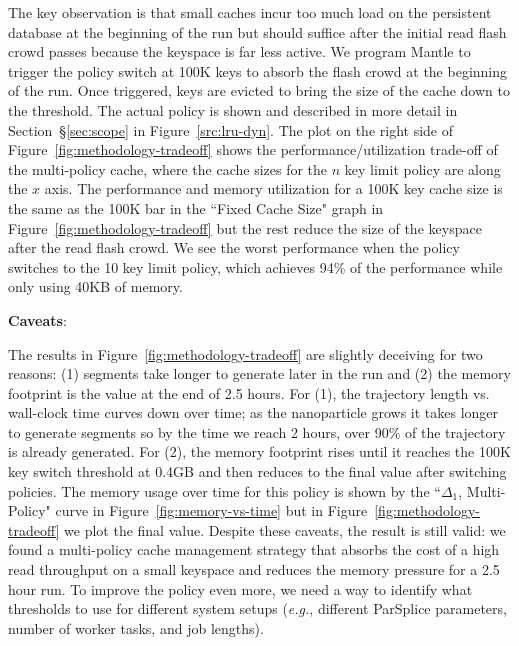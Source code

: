 The key observation is that small caches incur too much load on the persistent
database at the beginning of the run but should suffice after the initial read
flash crowd passes because the keyspace is far less active.  We program Mantle
to trigger the policy switch at 100K keys to absorb the flash crowd at the
beginning of the run. Once triggered, keys are evicted to bring the size of the
cache down to the threshold.  The actual policy is shown and described in more
detail in Section~\S\ref{sec:scope} in Figure~\ref{src:lru-dyn}.  The plot on
the right side of Figure~\ref{fig:methodology-tradeoff} shows the
performance/utilization trade-off of the multi-policy cache, where the cache
sizes for the \(n\) key limit policy are along the \(x\) axis.  The performance
and memory utilization for a 100K key cache size is the same as the 100K bar in
the ``Fixed Cache Size" graph in Figure~\ref{fig:methodology-tradeoff} but the
rest reduce the size of the keyspace after the read flash crowd.  We see the
worst performance when the policy switches to the 10 key limit policy, which
achieves 94\% of the performance while only using 40KB of memory. 

\textbf{Caveats}: 

The results in Figure~\ref{fig:methodology-tradeoff} are slightly deceiving for
two reasons: (1) segments take longer to generate later in the run and (2) the
memory footprint is the value at the end of 2.5 hours.  For (1), the trajectory
length vs.  wall-clock time curves down over time; as the nanoparticle grows it
takes longer to generate segments so by the time we reach 2 hours, over 90\% of
the trajectory is already generated.  For (2), the memory footprint rises until
it reaches the 100K key switch threshold at 0.4GB and then reduces to the final
value after switching policies. The memory usage over time for this policy is
shown by the ``\(\Delta_1\), Multi-Policy" curve in
Figure~\ref{fig:memory-vs-time} but in Figure~\ref{fig:methodology-tradeoff} we
plot the final value.  Despite these caveats, the result is still valid: we
found a multi-policy cache management strategy that absorbs the cost of a high
read throughput on a small keyspace and reduces the memory pressure for a 2.5
hour run.  To improve the policy even more, we need a way to identify what
thresholds to use for different system setups ({\it e.g.}, different ParSplice
parameters, number of worker tasks, and job lengths).  

